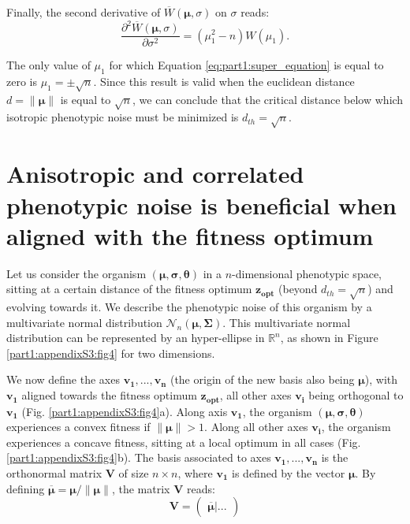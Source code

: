 Finally, the second derivative of $\overline{W}(\boldsymbol{\mu}, \sigma)$ on $\sigma$ reads:
\begin{equation}
\dfrac{\partial^2 \overline{W}(\boldsymbol{\mu}, \sigma)}{\partial \sigma^2} = (\mu_1^2-n)W(\mu_1).
\label{eq:part1:super_equation}
\end{equation}

The only value of $\mu_1$ for which Equation \ref{eq:part1:super_equation} is equal to zero is $\mu_1 = \pm \sqrt{n}$. Since this result is valid when the euclidean distance $d = \lVert \boldsymbol{\mu} \rVert$ is equal to $\sqrt{n}$, we can conclude that the critical distance below which isotropic phenotypic noise must be minimized is $d_{th} = \sqrt{n}$.


\section*{Anisotropic and correlated phenotypic noise is beneficial when aligned with the fitness optimum}

Let us consider the organism $(\boldsymbol{\mu}, \boldsymbol{\sigma}, \boldsymbol{\theta})$ in a $n$-dimensional phenotypic space, sitting at a certain distance of the fitness optimum $\boldsymbol{z_{opt}}$ (beyond $d_{th}=\sqrt{n}$) and evolving towards it. We describe the phenotypic noise of this organism by a multivariate normal distribution $\mathcal{N}_n(\boldsymbol{\mu},\boldsymbol{\Sigma})$. This multivariate normal distribution can be represented by an hyper-ellipse in $\mathbb{R}^n$, as shown in Figure \ref{part1:appendixS3:fig4} for two dimensions.

We now define the axes $\boldsymbol{v_1}, ..., \boldsymbol{v_n}$ (the origin of the new basis also being $\boldsymbol{\mu}$), with $\boldsymbol{v_1}$ aligned towards the fitness optimum $\boldsymbol{z_{opt}}$, all other axes $\boldsymbol{v_i}$ being orthogonal to $\boldsymbol{v_1}$ (Fig. \ref{part1:appendixS3:fig4}a).
Along axis $\boldsymbol{v_1}$, the organism $(\boldsymbol{\mu}, \boldsymbol{\sigma}, \boldsymbol{\theta})$ experiences a convex fitness if $\lVert \boldsymbol{\mu} \rVert > 1$. Along all other axes $\boldsymbol{v_i}$, the organism experiences a concave fitness, sitting at a local optimum in all cases (Fig. \ref{part1:appendixS3:fig4}b).
The basis associated to axes $\boldsymbol{v_1}, ..., \boldsymbol{v_n}$ is the orthonormal matrix $\boldsymbol{V}$ of size $n \times n$, where $\boldsymbol{v_1}$ is defined by the vector $\boldsymbol{\mu}$. By defining $\overline{\boldsymbol{\mu}} = \boldsymbol{\mu}/\lVert \boldsymbol{\mu} \rVert$, the matrix $\boldsymbol{V}$ reads:
\begin{equation}
\boldsymbol{V} = 
\begin{pmatrix}
\left. \overline{\boldsymbol{\mu}} \right| ... 
\end{pmatrix}
\end{equation}

